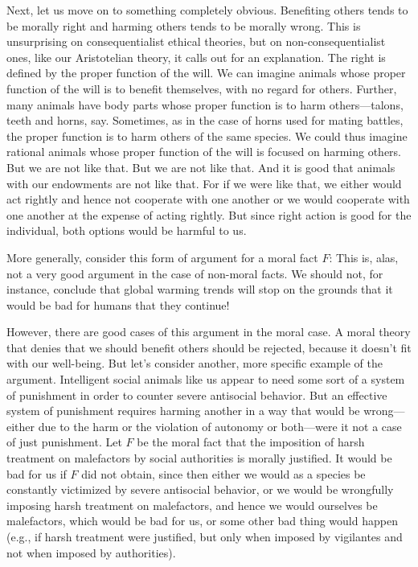 Next, let us move on to something completely obvious. Benefiting others tends to be morally right and harming others tends to be morally
wrong. This is unsurprising on consequentialist ethical theories, but on non-consequentialist ones, like our 
Aristotelian theory, it calls out for an explanation. The right is defined by the proper function of the will.
We can imagine animals whose proper function of the will is to benefit themselves, with no regard for others. 
Further, many animals have body parts whose proper function is to harm others---talons, teeth and horns, say. Sometimes,
as in the case of horns used for mating battles, the proper function is to harm others of the same species.
We could thus imagine rational animals whose proper function of the will is focused on harming others. But 
we are not like that. But we are not like that. And it is good that animals with our endowments are not like
that. For if we were like that, we either would act rightly and hence not cooperate with one another or we 
would cooperate with one another at the expense of acting rightly. But since right action is good for the individual,
both options would be harmful to us.

More generally, consider this form of argument for a moral fact $F$:
This is, alas, not a very good argument in the case of non-moral facts. We should not, for instance, conclude
that global warming trends will stop on the grounds that it would be bad for humans that they continue! 

However, there are good cases of this argument in the moral case. A moral theory that denies that we should
benefit others should be rejected, because it doesn't fit with our well-being. But let's consider another,
more specific example of the argument. Intelligent social 
animals like us appear to need some sort of a system of punishment in order to counter severe antisocial behavior. But an effective system 
of punishment requires harming another in a way that would be wrong---either due to the harm or the violation
of autonomy or both---were it not a case of just punishment. Let $F$ be the moral fact that the imposition of
harsh treatment on malefactors by social authorities is morally justified. It would be bad for us if $F$ did not
obtain, since then either we would as a species be constantly victimized by 
severe antisocial behavior, or we would be wrongfully imposing harsh treatment on malefactors, and hence
we would ourselves be malefactors, which would be bad for us, or some other bad thing would happen (e.g., if
harsh treatment were justified, but only when imposed by vigilantes and not when imposed by authorities). 

